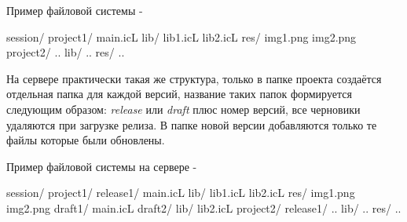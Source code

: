 Пример файловой системы -
\begin{jscode}
session/
	project1/
		main.icL
		lib/
			lib1.icL
			lib2.icL
		res/
			img1.png
			img2.png
		project2/
			..
			lib/
				..
			res/
				..
\end{jscode}

На сервере практически такая же структура, только в папке проекта создаётся отдельная папка для каждой версий, название таких папок формируется следующим образом: {\it release} или {\it draft} плюс номер версий, все черновики удаляются при загрузке релиза. В папке новой версии добавляются только те файлы которые были обновлены.

Пример файловой системы на сервере -

\begin{jscode}
session/
	project1/
		release1/
			main.icL
			lib/
				lib1.icL
				lib2.icL
			res/
				img1.png
				img2.png
		draft1/
			main.icL
		draft2/
			lib/
				lib2.icL
	project2/
		release1/
			..
			lib/
				..
			res/
				..
\end{jscode}